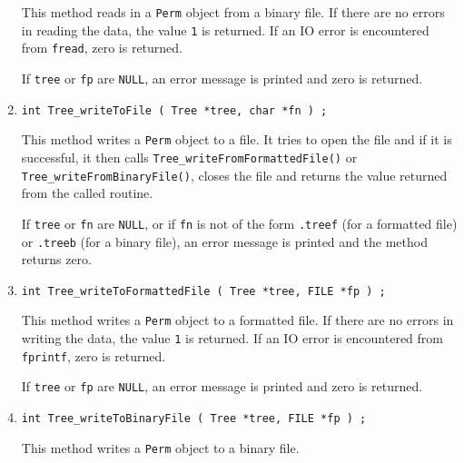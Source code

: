\begin{enumerate}
\par
This method reads in a {\tt Perm} object from a binary file.
If there are no errors in reading the data, 
the value {\tt 1} is returned.
If an IO error is encountered from {\tt fread}, zero is returned.
\par {}
If {\tt tree} or {\tt fp} are {\tt NULL}, 
an error message is printed and zero is returned.
\item
\begin{verbatim}
int Tree_writeToFile ( Tree *tree, char *fn ) ;
\end{verbatim}
\par
This method writes a {\tt Perm} object to a file.
It tries to open the file and if it is successful, 
it then calls {\tt Tree\_writeFromFormattedFile()} or
{\tt Tree\_writeFromBinaryFile()},
closes the file
and returns the value returned from the called routine.
\par {}
If {\tt tree} or {\tt fn} are {\tt NULL}, 
or if {\tt fn} is not of the form
{\tt *.treef} (for a formatted file) 
or {\tt *.treeb} (for a binary file),
an error message is printed and the method returns zero.
\item
\begin{verbatim}
int Tree_writeToFormattedFile ( Tree *tree, FILE *fp ) ;
\end{verbatim}
\par
This method writes a {\tt Perm} object to a formatted file.
If there are no errors in writing the data, 
the value {\tt 1} is returned.
If an IO error is encountered from {\tt fprintf}, zero is returned.
\par {}
If {\tt tree} or {\tt fp} are {\tt NULL}, 
an error message is printed and zero is returned.
\item
\begin{verbatim}
int Tree_writeToBinaryFile ( Tree *tree, FILE *fp ) ;
\end{verbatim}
\par
This method writes a {\tt Perm} object to a binary file.

\end{enumerate}
